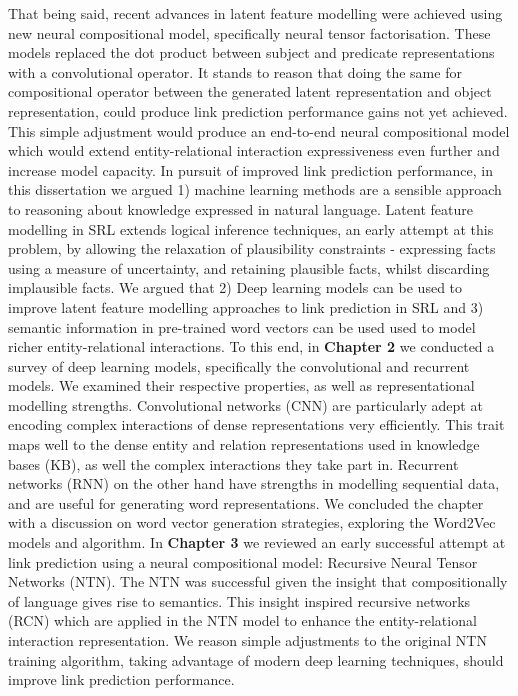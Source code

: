 That being said, recent advances in latent feature modelling were achieved using new neural compositional model, specifically neural tensor factorisation. These models replaced the dot product between subject and predicate representations with a convolutional operator. It stands to reason that doing the same for compositional operator between the generated latent representation and object representation, could produce link prediction performance gains not yet achieved. This simple adjustment would produce an end-to-end neural compositional model which would extend entity-relational interaction expressiveness even further and increase model capacity. In pursuit of improved link prediction performance, in this dissertation we argued 1) machine learning methods are a sensible approach to reasoning about knowledge expressed in natural language. Latent feature modelling in SRL extends logical inference techniques, an early attempt at this problem, by allowing the relaxation of plausibility constraints - expressing facts using a measure of uncertainty, and retaining plausible facts, whilst discarding implausible facts. We argued that 2) Deep learning models can be used to improve latent feature modelling approaches to link prediction in SRL and 3) semantic information in pre-trained word vectors can be used used to model richer entity-relational interactions. \newline
To this end, in \textbf{Chapter 2} we conducted a survey of deep learning models, specifically the convolutional and recurrent models. We examined their respective properties, as well as representational modelling strengths. Convolutional networks (CNN) are particularly adept at encoding complex interactions of dense representations very efficiently. This trait maps well to the dense entity and relation representations used in knowledge bases (KB), as well the complex interactions they take part in. Recurrent networks (RNN) on the other hand have strengths in modelling sequential data, and are useful for generating word representations. We concluded the chapter with a discussion on word vector generation strategies, exploring the Word2Vec models and algorithm. \newline
In \textbf{Chapter 3} we reviewed an early successful attempt at link prediction using a neural compositional model: Recursive Neural Tensor Networks (NTN). The NTN was successful given the insight that compositionally of language gives rise to semantics. This insight inspired recursive networks (RCN) which are applied in the NTN model to enhance the entity-relational interaction representation. We reason simple adjustments to the original NTN training algorithm, taking advantage of modern deep learning techniques, should improve link prediction performance. \newpage 
